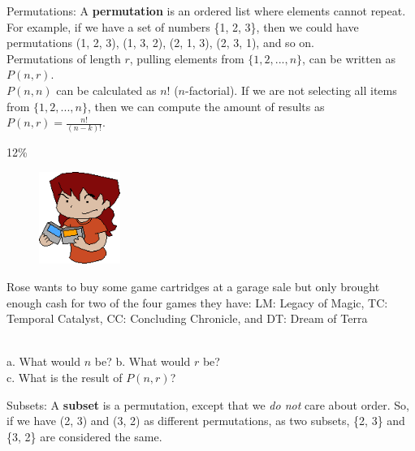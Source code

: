 \documentclass[a4paper,12pt]{book}
\begin{document}
        \begin{intro}{Permutations:}
            A \textbf{permutation} is an ordered list where elements cannot repeat.
            For example, if we have a set of numbers \{1, 2, 3\}, then
            we could have permutations (1, 2, 3), (1, 3, 2), (2, 1, 3), (2, 3, 1),
            and so on. ~\\

            Permutations of length $r$, pulling elements from
            $\{1, 2, ..., n\}$, can be written as $P(n,r)$. ~\\

            $P(n, n)$ can be calculated as $n!$ ($n$-factorial). If we are
            not selecting all items from $\{1, 2, ..., n\}$, then we can
            compute the amount of results as         
            $P(n, r) = \frac{n!}{(n-k)!}$.
        \end{intro}

        \begin{question}{3}{12\%}

            \begin{figure}
                \includegraphics[height=3cm]{images/5-3-games.png}
            \end{figure}
        
            Rose wants to buy some game cartridges at a garage sale
            but only brought enough cash for two of the four games they have:
            LM: Legacy of Magic, TC: Temporal Catalyst, CC: Concluding Chronicle, and DT: Dream of Terra

            ~\\
            \tab a. What would $n$ be?
            \tab b. What would $r$ be? \\
            \tab c. What is the result of $P(n, r)$?
        \end{question}

    \begin{intro}{Subsets:}
        A \textbf{subset} is a permutation, except that we \textit{do not}
        care about order. So, if we have (2, 3) and (3, 2) as different
        permutations, as two subsets, \{2, 3\} and \{3, 2\} are considered
        the same.
    \end{intro}
\end{document}
